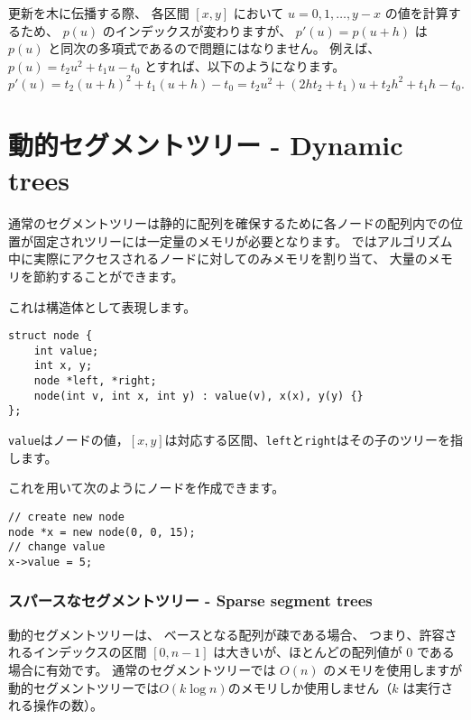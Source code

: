 更新を木に伝播する際、
各区間 $[x, y]$ において $u=0,1,\ldots,y-x$ の値を計算するため、
$p(u)$ のインデックスが変わりますが、
$p'(u)=p(u+h)$ は $p(u)$ と同次の多項式であるので問題にはなりません。
例えば、$p(u)=t_2 u^2+t_1 u-t_0$ とすれば、以下のようになります。
\[p'(u)=t_2(u+h)^2+t_1(u+h)-t_0=t_2 u^2 + (2ht_2+t_1)u+t_2h^2+t_1h-t_0.\]

\section{動的セグメントツリー - Dynamic trees}


通常のセグメントツリーは静的に配列を確保するために各ノードの配列内での位置が固定されツリーには一定量のメモリが必要となります。
ではアルゴリズム中に実際にアクセスされるノードに対してのみメモリを割り当て、
大量のメモリを節約することができます。

これは構造体として表現します。
\begin{lstlisting}
struct node {
    int value;
    int x, y;
    node *left, *right;
    node(int v, int x, int y) : value(v), x(x), y(y) {}
};
\end{lstlisting}
\texttt{value}はノードの値，$[x, y]$は対応する区間、\texttt{left}と\texttt{right}はその子のツリーを指します。

これを用いて次のようにノードを作成できます。
\begin{lstlisting}
// create new node
node *x = new node(0, 0, 15);
// change value
x->value = 5;
\end{lstlisting}

\subsubsection{スパースなセグメントツリー - Sparse segment trees}


動的セグメントツリーは、
ベースとなる配列が疎である場合、
つまり、許容されるインデックスの区間 $[0,n-1]$ は大きいが、ほとんどの配列値が 0 である場合に有効です。
通常のセグメントツリーでは $O(n)$ のメモリを使用しますが動的セグメントツリーでは$O(k \log n)$のメモリしか使用しません（$k$ は実行される操作の数）。

